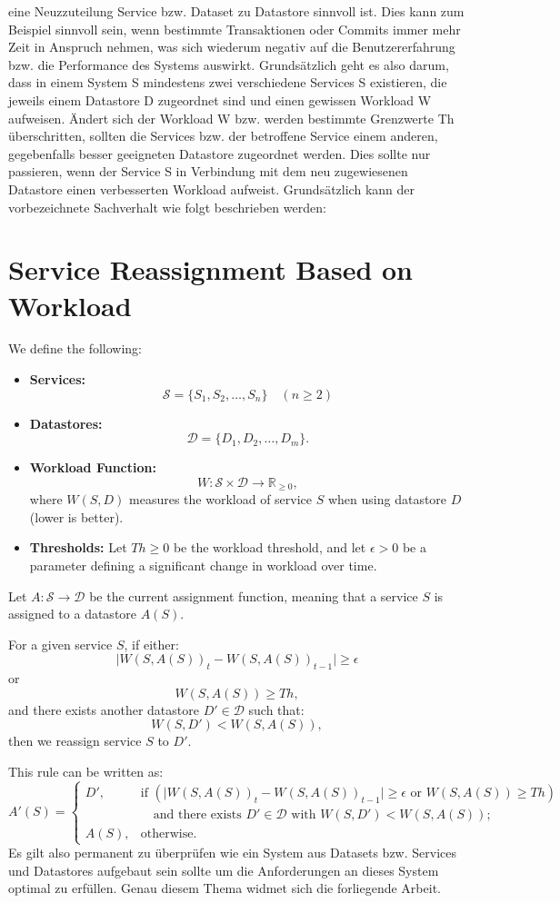 eine Neuzzuteilung Service bzw. Dataset zu Datastore sinnvoll ist. Dies kann zum Beispiel sinnvoll sein,
wenn bestimmte Transaktionen oder Commits immer mehr Zeit in Anspruch nehmen, was sich wiederum
negativ auf die Benutzererfahrung bzw. die Performance des Systems auswirkt.
Grundsätzlich geht es also darum, dass in einem System S mindestens zwei verschiedene Services
S existieren,
die jeweils einem Datastore D zugeordnet sind und einen gewissen Workload W aufweisen. 
Ändert sich der Workload W bzw. werden bestimmte Grenzwerte Th überschritten, sollten die Services
bzw. der betroffene Service einem anderen, gegebenfalls besser geeigneten Datastore zugeordnet werden.
Dies sollte nur passieren, wenn der Service S in Verbindung mit dem neu zugewiesenen Datastore
einen verbesserten Workload aufweist.
Grundsätzlich kann der vorbezeichnete Sachverhalt wie folgt beschrieben werden:
\section*{Service Reassignment Based on Workload}

We define the following:

\begin{itemize}
    \item \textbf{Services:} 
    \[
    \mathcal{S} = \{ S_1, S_2, \ldots, S_n \} \quad (n \geq 2)
    \]
    \item \textbf{Datastores:} 
    \[
    \mathcal{D} = \{ D_1, D_2, \ldots, D_m \}.
    \]
    \item \textbf{Workload Function:} 
    \[
    W: \mathcal{S} \times \mathcal{D} \to \mathbb{R}_{\ge0},
    \]
    where \(W(S,D)\) measures the workload of service \(S\) when using datastore \(D\) (lower is better).
    \item \textbf{Thresholds:} Let \(Th \ge 0\) be the workload threshold, and let \(\epsilon > 0\) be a parameter defining a significant change in workload over time.
\end{itemize}

Let \(A: \mathcal{S} \to \mathcal{D}\) be the current assignment function, meaning that a service \(S\) is assigned to a datastore \(A(S)\).

For a given service \(S\), if either:
\[
\bigl|W(S, A(S))_t - W(S, A(S))_{t-1}\bigr| \ge \epsilon
\]
or
\[
W(S, A(S)) \ge Th,
\]
and there exists another datastore \(D' \in \mathcal{D}\) such that:
\[
W(S, D') < W(S, A(S)),
\]
then we reassign service \(S\) to \(D'\).

This rule can be written as:
\[
A'(S) =
\begin{cases}
D', & \text{if } \left( \bigl|W(S, A(S))_t - W(S, A(S))_{t-1}\bigr| \ge \epsilon \text{ or } W(S, A(S)) \ge Th \right) \\
    & \quad \text{and there exists } D' \in \mathcal{D} \text{ with } W(S, D') < W(S, A(S)); \\[1ex]
A(S), & \text{otherwise.}
\end{cases}
\]
Es gilt also permanent zu überprüfen wie ein System aus Datasets bzw. 
Services und Datastores aufgebaut sein sollte um die Anforderungen 
an dieses System optimal zu erfüllen. Genau diesem Thema widmet sich die forliegende Arbeit.
%
%
